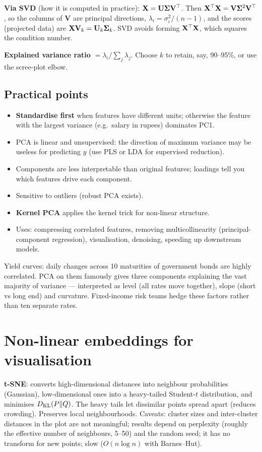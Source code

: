 \textbf{Via SVD} (how it is computed in practice): $\mathbf{X}=\mathbf{U}\bm\Sigma\mathbf{V}^\top$. Then $\mathbf{X}^\top\mathbf{X}=\mathbf{V}\bm\Sigma^2\mathbf{V}^\top$, so the columns of $\mathbf{V}$ are principal directions, $\lambda_i=\sigma_i^2/(n-1)$, and the scores (projected data) are $\mathbf{X}\mathbf{V}_k=\mathbf{U}_k\bm\Sigma_k$. SVD avoids forming $\mathbf{X}^\top\mathbf{X}$, which squares the condition number.

\textbf{Explained variance ratio} $=\lambda_i/\sum_j\lambda_j$. Choose $k$ to retain, say, 90--95\%, or use the scree-plot elbow.

\subsection{Practical points}
\begin{itemize}
  \item \textbf{Standardise first} when features have different units; otherwise the feature with the largest variance (e.g.\ salary in rupees) dominates PC1.
  \item PCA is linear and unsupervised: the direction of maximum variance may be useless for predicting $y$ (use PLS or LDA for supervised reduction).
  \item Components are less interpretable than original features; loadings tell you which features drive each component.
  \item Sensitive to outliers (robust PCA exists).
  \item \textbf{Kernel PCA} applies the kernel trick for non-linear structure.
  \item Uses: compressing correlated features, removing multicollinearity (principal-component regression), visualisation, denoising, speeding up downstream models.
\end{itemize}

\begin{realworld}
Yield curves: daily changes across 10 maturities of government bonds are highly correlated. PCA on them famously gives three components explaining the vast majority of variance --- interpreted as level (all rates move together), slope (short vs long end) and curvature. Fixed-income risk teams hedge these factors rather than ten separate rates.
\end{realworld}

\section{Non-linear embeddings for visualisation}
\textbf{t-SNE}: converts high-dimensional distances into neighbour probabilities (Gaussian), low-dimensional ones into a heavy-tailed Student-$t$ distribution, and minimises $D_{\mathrm{KL}}(P\|Q)$. The heavy tails let dissimilar points spread apart (reduces crowding). Preserves local neighbourhoods. Caveats: cluster sizes and inter-cluster distances in the plot are not meaningful; results depend on perplexity (roughly the effective number of neighbours, 5--50) and the random seed; it has no transform for new points; slow ($O(n\log n)$ with Barnes--Hut).


